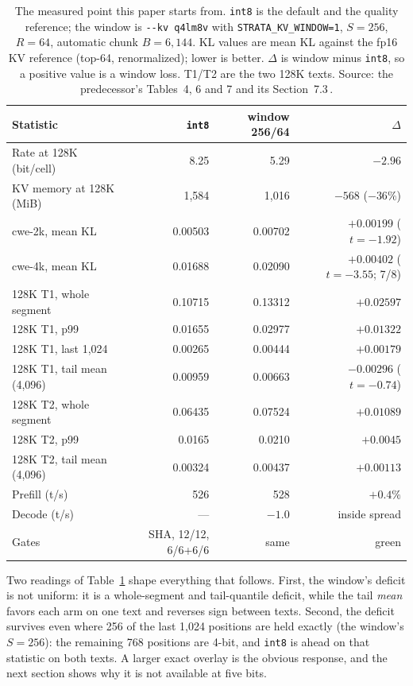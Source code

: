 \documentclass[10pt,twocolumn]{article}
\begin{document}
\begin{table}[t]
\centering
\footnotesize
\caption{The measured point this paper starts from. \texttt{int8} is the default and the quality reference; the window is \texttt{-{}-kv q4lm8v} with \texttt{STRATA\_KV\_WINDOW=1}, $S{=}256$, $R{=}64$, automatic chunk $B{=}6{,}144$. KL values are mean KL against the fp16 KV reference (top-64, renormalized); lower is better. $\Delta$ is window minus \texttt{int8}, so a positive value is a window loss. T1/T2 are the two 128K texts. Source: the predecessor's Tables~4, 6 and 7 and its Section~7.3\,\cite{kvwin,strata-details}.}
\label{tab:point}
\begin{tabular}{@{}lrrr@{}}
\toprule
Statistic & \texttt{int8} & window 256/64 & $\Delta$ \\
\midrule
Rate at 128K (bit/cell) & 8.25 & 5.29 & $-2.96$ \\
KV memory at 128K (MiB) & 1,584 & 1,016 & $-568$ ($-36\%$) \\
\midrule
cwe-2k, mean KL & 0.00503 & 0.00702 & $+0.00199$ ($t{=}-1.92$) \\
cwe-4k, mean KL & 0.01688 & 0.02090 & $+0.00402$ ($t{=}-3.55$; 7/8) \\
\midrule
128K T1, whole segment & 0.10715 & 0.13312 & $+0.02597$ \\
128K T1, p99 & 0.01655 & 0.02977 & $+0.01322$ \\
128K T1, last 1,024 & 0.00265 & 0.00444 & $+0.00179$ \\
128K T1, tail mean (4,096) & 0.00959 & 0.00663 & $-0.00296$ ($t{=}-0.74$) \\
\midrule
128K T2, whole segment & 0.06435 & 0.07524 & $+0.01089$ \\
128K T2, p99 & 0.0165 & 0.0210 & $+0.0045$ \\
128K T2, tail mean (4,096) & 0.00324 & 0.00437 & $+0.00113$ \\
\midrule
Prefill (t/s) & 526 & 528 & $+0.4\%$ \\
Decode (t/s) & --- & $-1.0$ & inside spread \\
Gates & SHA, 12/12, 6/6+6/6 & same & green \\
\bottomrule
\end{tabular}
\end{table}

Two readings of Table~\ref{tab:point} shape everything that follows. First, the window's deficit is not uniform: it is a whole-segment and tail-quantile deficit, while the tail \emph{mean} favors each arm on one text and reverses sign between texts. Second, the deficit survives even where 256 of the last 1,024 positions are held exactly (the window's $S{=}256$): the remaining 768 positions are 4-bit, and \texttt{int8} is ahead on that statistic on both texts. A larger exact overlay is the obvious response, and the next section shows why it is not available at five bits.
\end{document}

